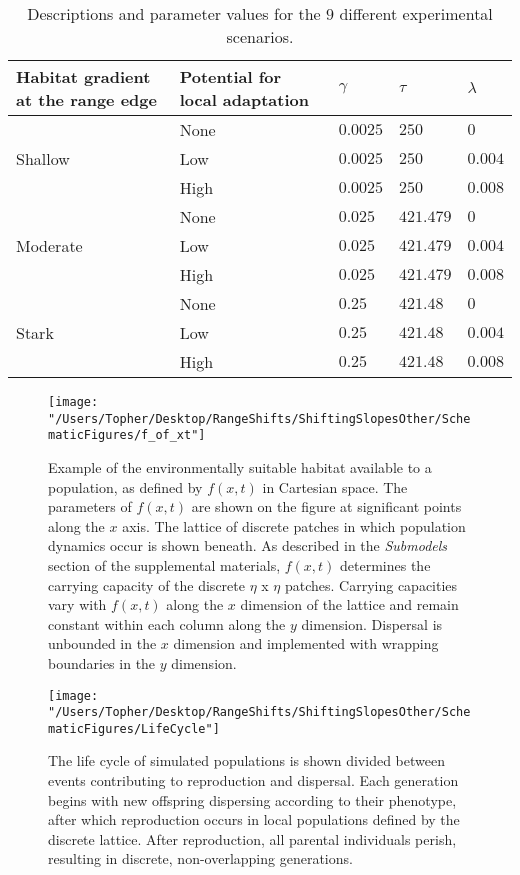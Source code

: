 \documentclass[12pt, oneside]{article}
\begin{document}
\begin{table}
\renewcommand{\arraystretch}{1.5}
  \begin{tabular}{ p{4cm} | p{4cm} | p{1.5cm} | p{1.5cm} | p{1.5cm} }
    \hline
    Habitat gradient at the range edge & Potential for local adaptation & $\gamma$ & $\tau$ & $\lambda$  \\ \hline \hline
     & None & $0.0025$ & $250$ & $0$ \\
    Shallow & Low & $0.0025$ & $250$ & $0.004$ \\
     & High & $0.0025$ & $250$ & $0.008$ \\ \hline
     & None & $0.025$ & $421.479$ & $0$ \\
    Moderate & Low & $0.025$ & $421.479$ & $0.004$ \\
     & High & $0.025$ & $421.479$ & $0.008$ \\ \hline
     & None & $0.25$ & $421.48$ & $0$ \\
    Stark & Low & $0.25$ & $421.48$ & $0.004$ \\
     & High & $0.25$ & $421.48$ & $0.008$ \\ 
    \hline
  \end{tabular}
\caption[LoF entry]{Descriptions and parameter values for the $9$ different experimental scenarios.}
\label{table:Scenarios}
\end{table}

\clearpage

\begin{figure}
\centering
\texttt{[image: "/Users/Topher/Desktop/RangeShifts/ShiftingSlopesOther/SchematicFigures/f\_of\_xt"]}
\vspace{-5mm}
\caption[LoF entry]{Example of the environmentally suitable habitat available to a population, as defined by $f(x,t)$ in Cartesian space. The parameters of $f(x,t)$ are shown on the figure at significant points along the $x$ axis. The lattice of discrete patches in which population dynamics occur is shown beneath. As described in the \textit{Submodels} section of the supplemental materials, $f(x,t)$ determines the carrying capacity of the discrete $\eta$ x $\eta$ patches. Carrying capacities vary with $f(x,t)$ along the $x$ dimension of the lattice and remain constant within each column along the $y$ dimension. Dispersal is unbounded in the $x$ dimension and implemented with wrapping boundaries in the $y$ dimension.}
\label{fig:EnvFunction}
\end{figure}

\begin{figure}
\centering
\texttt{[image: "/Users/Topher/Desktop/RangeShifts/ShiftingSlopesOther/SchematicFigures/LifeCycle"]}
\vspace{-5mm}
\caption[LoF entry]{The life cycle of simulated populations is shown divided between events contributing to reproduction and dispersal. Each generation begins with new offspring dispersing according to their phenotype, after which reproduction occurs in local populations defined by the discrete lattice. After reproduction, all parental individuals perish, resulting in discrete, non-overlapping generations.}
\label{fig:LifeCycle}
\end{figure}
\end{document}

